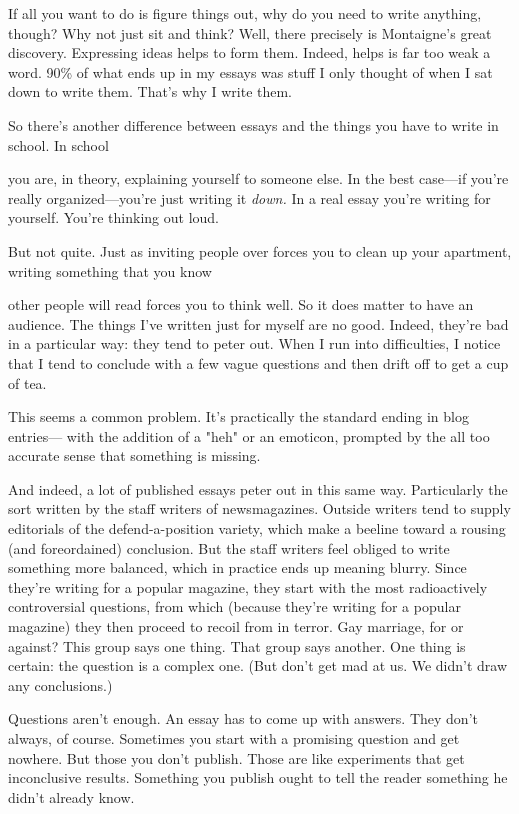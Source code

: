 If all you want to do is figure things out, why do you need
to write anything, though?  Why not just sit and think?  Well,
there precisely is Montaigne's great discovery.  Expressing
ideas helps to form them.  Indeed, helps is far too weak a
word.  90\%
of what ends up in my essays was stuff
I only
thought of when I sat down to write them.  That's why I
write them.

So there's another difference between essays and
the things
you have to write in school.   In school

you are, in theory,
explaining yourself to someone else.  In the best case---if
you're really organized---you're just writing it \emph{down.}
In a real essay you're writing for yourself.  You're
thinking out loud.

But not quite.  Just as inviting people over forces you to
clean up your apartment, writing something that you know

other people will read forces you to think well.  So it
does matter to have an audience.  The things I've written
just for myself are no good.  Indeed, they're bad in
a particular way:
they tend to peter out.  When I run into
difficulties, I notice that I
tend to conclude with a few vague
questions and then drift off to get a cup of tea.

This seems a common problem.
It's practically the standard
ending in blog entries--- with the addition of a "heh" or an 
emoticon, prompted by the all too accurate sense that
something is missing.

And indeed, a lot of
published essays peter out in this
same way.
Particularly the sort written by the staff writers of newsmagazines.  Outside writers tend to supply
editorials of the defend-a-position variety, which
make a beeline toward a rousing (and
foreordained) conclusion.   But the staff writers feel
obliged to write something more
balanced, which in
practice ends up meaning blurry.
Since they're
writing for a popular magazine, they start with the
most radioactively controversial questions, from which
(because they're writing for a popular magazine)
they then proceed to recoil from
in terror.
Gay marriage, for or
against?  This group says one thing.  That group says
another.  One thing is certain: the question is a
complex one.  (But don't get mad at us.  We didn't
draw any conclusions.)

Questions aren't enough.  An essay has to come up with answers.
They don't always, of course.  Sometimes you start with a  
promising question and get nowhere.  But those you don't
publish.  Those are like experiments that get inconclusive
results.   Something you publish ought to tell the reader  
something he didn't already know.


